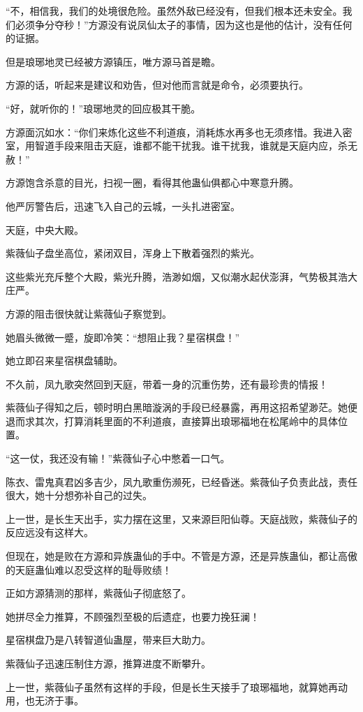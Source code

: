 \begin{this_body}
“不，相信我，我们的处境很危险。虽然外敌已经没有，但我们根本还未安全。我们必须争分夺秒！”方源没有说凤仙太子的事情，因为这也是他的估计，没有任何的证据。

但是琅琊地灵已经被方源镇压，唯方源马首是瞻。

方源的话，听起来是建议和劝告，但对他而言就是命令，必须要执行。

“好，就听你的！”琅琊地灵的回应极其干脆。

方源面沉如水：“你们来炼化这些不利道痕，消耗炼水再多也无须疼惜。我进入密室，用智道手段来阻击天庭，谁都不能干扰我。谁干扰我，谁就是天庭内应，杀无赦！”

方源饱含杀意的目光，扫视一圈，看得其他蛊仙俱都心中寒意升腾。

他严厉警告后，迅速飞入自己的云城，一头扎进密室。

天庭，中央大殿。

紫薇仙子盘坐高位，紧闭双目，浑身上下散着强烈的紫光。

这些紫光充斥整个大殿，紫光升腾，浩渺如烟，又似潮水起伏澎湃，气势极其浩大庄严。

方源的阻击很快就让紫薇仙子察觉到。

她眉头微微一蹙，旋即冷笑：“想阻止我？星宿棋盘！”

她立即召来星宿棋盘辅助。

不久前，凤九歌突然回到天庭，带着一身的沉重伤势，还有最珍贵的情报！

紫薇仙子得知之后，顿时明白黑暗漩涡的手段已经暴露，再用这招希望渺茫。她便退而求其次，打算消耗里面的不利道痕，直接算出琅琊福地在松尾岭中的具体位置。

“这一仗，我还没有输！”紫薇仙子心中憋着一口气。

陈衣、雷鬼真君凶多吉少，凤九歌重伤濒死，已经昏迷。紫薇仙子负责此战，责任很大，她十分想弥补自己的过失。

上一世，是长生天出手，实力摆在这里，又来源巨阳仙尊。天庭战败，紫薇仙子的反应远没有这样大。

但现在，她是败在方源和异族蛊仙的手中。不管是方源，还是异族蛊仙，都让高傲的天庭蛊仙难以忍受这样的耻辱败绩！

正如方源猜测的那样，紫薇仙子彻底怒了。

她拼尽全力推算，不顾强烈至极的后遗症，也要力挽狂澜！

星宿棋盘乃是八转智道仙蛊屋，带来巨大助力。

紫薇仙子迅速压制住方源，推算进度不断攀升。

上一世，紫薇仙子虽然有这样的手段，但是长生天接手了琅琊福地，就算她再动用，也无济于事。


\end{this_body}
